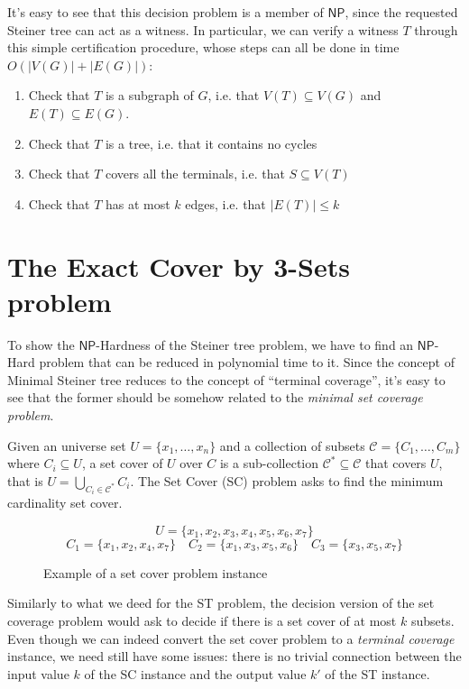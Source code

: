 \documentclass[12pt,a4paper]{article}
\newcommand{\curlyquotes}[1]{\textquotedblleft #1\textquotedblright}
\newcommand{\abs}[1]{\left|#1\right|}
\begin{document}
    It's easy to see that this decision problem is a member of $\mathsf{NP}$, since the requested Steiner tree can act as a witness. In particular, we can verify a witness $T$ through this simple certification procedure, whose steps can all be done in time $O(\abs{V(G)} + \abs{E(G)})$:
    \begin{enumerate}
        \item Check that $T$ is a subgraph of $G$, i.e. that $V(T) \subseteq V(G)$ and $E(T) \subseteq E(G)$.
        \item Check that $T$ is a tree, i.e. that it contains no cycles
        \item Check that $T$ covers all the terminals, i.e. that $S \subseteq V(T)$
        \item Check that $T$ has at most $k$ edges, i.e. that $\abs{E(T)} \leq k$
    \end{enumerate}

    \section{The Exact Cover by 3-Sets problem}

    To show the $\mathsf{NP}$-Hardness of the Steiner tree problem, we have to find an $\mathsf{NP}$-Hard problem that can be reduced in polynomial time to it. Since the concept of Minimal Steiner tree reduces to the concept of \curlyquotes{terminal coverage}, it's easy to see that the former should be somehow related to the \textit{minimal set coverage problem}.

    Given an universe set $U = \{x_1, \ldots, x_n\}$ and a collection of subsets $\mathcal{C} = \{C_1, \ldots, C_m\}$ where $C_i \subseteq U$, a set cover of $U$ over $C$ is a sub-collection $\mathcal{C}^* \subseteq \mathcal{C}$ that covers $U$, that is $U = \bigcup_{C_i \in \mathcal{C}^*} C_i$. The Set Cover (SC) problem asks to find the minimum cardinality set cover.

    \begin{figure}[H]
        \[U = \{x_1, x_2, x_3, x_4, x_5, x_6, x_7\}\]
        \[C_1 = \{x_1, x_2, x_4, x_7\} \quad C_2 = \{x_1, x_3, x_5, x_6\} \quad C_3 = \{x_3, x_5, x_7\}\]

        \caption{Example of a set cover problem instance}
    \end{figure}
    
    Similarly to what we deed for the ST problem, the decision version of the set coverage problem would ask to decide if there is a set cover of at most $k$ subsets. Even though we can indeed convert the set cover problem to a \textit{terminal coverage} instance, we need still have some issues: there is no trivial connection between the input value $k$ of the SC instance and the output value $k'$ of the ST instance.
    
\end{document}
